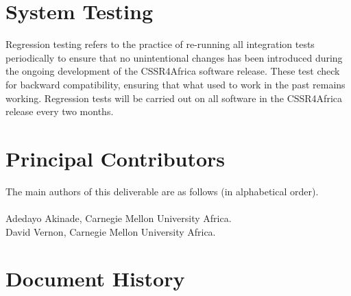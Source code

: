 \documentclass{CSSRforAfrica}
\newcommand{\blank}{~\\}
\begin{document}
  
\section{System Testing}
\label{section:system_testing}
  
Regression testing refers to the practice of re-running all integration tests periodically to ensure that no  unintentional changes has been introduced during the ongoing development of the CSSR4Africa software release.   These test check for backward compatibility, ensuring that what used to work in the past remains working.    Regression tests will be carried out on all software in the CSSR4Africa release every two months.

 
\newpage




\pagebreak
\section*{Principal Contributors}
\label{contributors}
The main authors of this deliverable are as follows (in alphabetical order).
\blank
~
\blank
Adedayo Akinade, Carnegie Mellon University Africa.\\     
David Vernon, Carnegie Mellon University Africa.\\     

  

\newpage
\section*{Document History}
\label{document_history}
\end{document}
